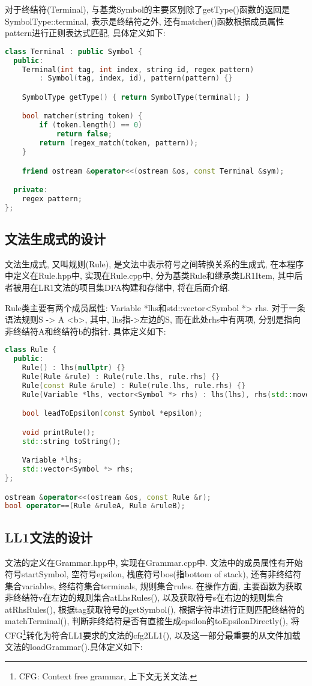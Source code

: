 对于终结符(Terminal),
与基类Symbol的主要区别除了getType()函数的返回是SymbolType::terminal,
表示是终结符之外, 还有matcher()函数根据成员属性pattern进行正则表达式匹配,
具体定义如下:

\begin{lstlisting}[language=c++]
class Terminal : public Symbol {
  public:
    Terminal(int tag, int index, string id, regex pattern)
        : Symbol(tag, index, id), pattern(pattern) {}

    SymbolType getType() { return SymbolType(terminal); }

    bool matcher(string token) {
        if (token.length() == 0)
            return false;
        return (regex_match(token, pattern));
    }

    friend ostream &operator<<(ostream &os, const Terminal &sym);

  private:
    regex pattern;
};
\end{lstlisting}

\subsection{文法生成式的设计}
文法生成式, 又叫规则(Rule), 是文法中表示符号之间转换关系的生成式,
在本程序中定义在Rule.hpp中, 实现在Rule.cpp中, 分为基类Rule和继承类LR1Item,
其中后者被用在LR1文法的项目集DFA构建和存储中, 将在后面介绍.\par

Rule类主要有两个成员属性: Variable *lhs和std::vector<Symbol *> rhs.
对于一条语法规则S -> A <b>, 其中, lhs指->左边的S, 而在此处rhs中有两项,
分别是指向非终结符A和终结符b的指针. 具体定义如下:

\begin{lstlisting}[language=c++]
class Rule {
  public:
    Rule() : lhs(nullptr) {}
    Rule(Rule &rule) : Rule(rule.lhs, rule.rhs) {}
    Rule(const Rule &rule) : Rule(rule.lhs, rule.rhs) {}
    Rule(Variable *lhs, vector<Symbol *> rhs) : lhs(lhs), rhs(std::move(rhs)) {}

    bool leadToEpsilon(const Symbol *epsilon);

    void printRule();
    std::string toString();

    Variable *lhs;
    std::vector<Symbol *> rhs;
};

ostream &operator<<(ostream &os, const Rule &r);
bool operator==(Rule &ruleA, Rule &ruleB);
\end{lstlisting}

\subsection{LL1文法的设计}
文法的定义在Grammar.hpp中, 实现在Grammar.cpp中.
文法中的成员属性有开始符号startSymbol, 空符号epsilon, 栈底符号bos(指bottom of
stack), 还有非终结符集合variables, 终结符集合terminals, 规则集合rules.
在操作方面, 主要函数为获取非终结符v在左边的规则集合atLhsRules(),
以及获取符号s在右边的规则集合atRhsRules(), 根据tag获取符号的getSymbol(),
根据字符串进行正则匹配终结符的matchTerminal(),
判断非终结符是否有直接生成epsilon的toEpsilonDirectly(), 将CFG\footnote{CFG:
	Context free grammar, 上下文无关文法.}转化为符合LL1要求的文法的cfg2LL1(),
以及这一部分最重要的从文件加载文法的loadGrammar().具体定义如下:


